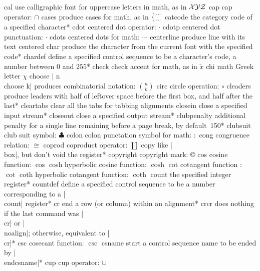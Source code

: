 \capcs cal {use calligraphic font for uppercase letters in math,
   as in $\cal XYZ$}{}{}
\capcs cap {cap operator: $\cap$}{}{}
\capcs cases {produce cases for math, as in $\bigl\{{\cdots\atop\cdots}$}{}{}
\capcs catcode {the category code of a specified character}*{}
\capcs cdot {centered dot operator: $\cdot$}{}{}
\capcs cdotp {centered dot punctuation: $\cdotp$}{}{}
\capcs cdots {centered dots for math: $\cdots$}{}{}
\capcs centerline {produce line with its text centered}{}{}
\capcs char {produce the character from the current font with the specified
   code}*{}
\capcs chardef {define a specified control sequence to be a character's
   code, a number between 0 and $255$}*{}
\capcs check {check accent for math, as in $\check x$}{}{}
\capcs chi {math Greek letter $\chi$}{}{}
\capcs choose {| n\\choose k| produces combinatorial notation:
   $n \choose k$}{}{}
\capcs circ {circle operation: $\circ$}{}{}
\capcs cleaders {produce leaders with half of leftover space before
   the first box, and half after the last}*{}
\capcs cleartabs {clear all the tabs for tabbing alignments}{}{}
\capcs closein {close a specified input stream}*{}
\capcs closeout {close a specified output stream}*{}
\capcs clubpenalty {additional penalty for a single line remaining before
   a page break, by default~150}*{}
\capcs clubsuit {club suit symbol: $\clubsuit$}{}{}
\capcs colon {colon punctation symbol for math: $:$}{}{}
\capcs cong {congruence relation: $\cong$}{}{}
\capcs coprod {coproduct operator: $\coprod$}{}{}
\capcs copy {like |\\box|, but don't void the register}*{}
\capcs copyright {copyright mark: \copyright}{}{}
\capcs cos {cosine function: $\cos$}{}{}
\capcs cosh {hyperbolic cosine function: $\cosh$}{}{}
\capcs cot {cotangent function : $\cot$}{}{}
\capcs coth {hyperbolic cotangent function: $\coth$}{}{}
\capcs count {the specified integer register}*{}
\capcs countdef {define a specified control sequence to be a number
   corresponding to a |\\count| register}*{}
\capcs cr {end a row (or column) within an alignment}*{}
\capcs crcr {does nothing if the last command was |\\cr| or |\\noalign|;
   otherwise, equivalent to |\\cr|}*{}
\capcs csc {cosecant function: $\csc$}{}{}
\capcs csname {start a control sequence name to be ended by |\\endcsname|}*{}
\capcs cup {cup operator: $\cup$}{}{}
